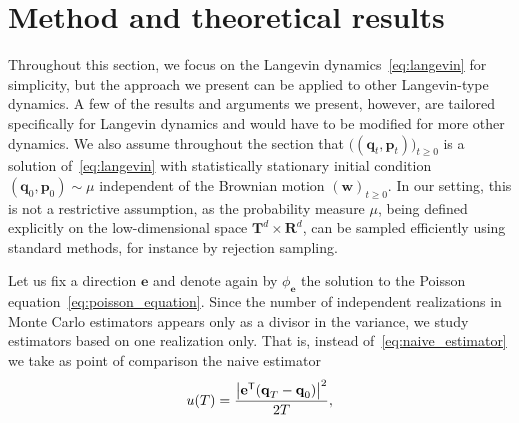 \documentclass[11pt,a4paper]{article}
\newcommand{\real}{\mathbf R}
\newcommand{\torus}{\mathbf T}
\newcommand{\vect}[1]{\boldsymbol{\mathbf #1}}
\renewcommand{\t}{\mathsf T}
\theoremstyle{plain}
\numberwithin{equation}{section}
\renewcommand{\geq}{\geqslant}
\begin{document}
\section{Method and theoretical results}%
\label{sec:method}%

Throughout this section,
we focus on the Langevin dynamics~\eqref{eq:langevin} for simplicity,
but the approach we present can be applied to other Langevin-type dynamics.
A few of the results and arguments we present, however,
are tailored specifically for Langevin dynamics and would have to be modified for more other dynamics.
We also assume throughout the section that $\bigl((\vect q_t, \vect p_t)\bigr)_{t\geq 0}$ is a solution of~\eqref{eq:langevin} with statistically stationary initial condition~$(\vect q_0, \vect p_0) \sim \mu$ independent of the Brownian motion $(\vect w)_{t \geq 0}$.
In our setting, this is not a restrictive assumption,
as the probability measure $\mu$,
being defined explicitly on the low-dimensional space $\torus^d \times \real^d$,
can be sampled efficiently using standard methods,
for instance by rejection sampling.

Let us fix a direction $\vect e$ and denote again by $\phi_{\vect e}$ the solution to the Poisson equation~\eqref{eq:poisson_equation}.
Since the number of independent realizations in Monte Carlo estimators
appears only as a divisor in the variance,
we study estimators based on one realization only.
That is, instead of~\eqref{eq:naive_estimator} we take as point of comparison the naive estimator
\begin{equation}
    \label{eq:simple_estimator}
    u(T) = \frac{\abs{\vect e^\t (\vect q_T - \vect q_0)}^2}{2T},
\end{equation}
\end{document}
